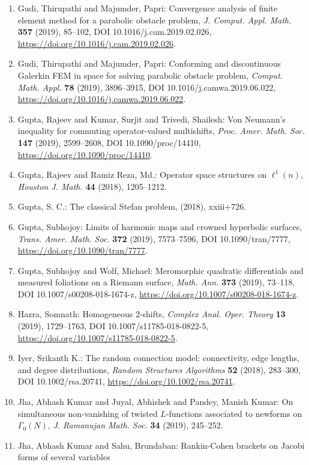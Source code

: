 \begin{enumerate}
\item Gudi, Thirupathi and Majumder, Papri: Convergence analysis of finite element method for a parabolic
obstacle problem, \emph{J. Comput. Appl. Math.} {\bf 357} (2019), 85--102, DOI 10.1016/j.cam.2019.02.026, \url{https://doi.org/10.1016/j.cam.2019.02.026}.
\item Gudi, Thirupathi and Majumder, Papri: Conforming and discontinuous {G}alerkin {FEM} in space for
solving parabolic obstacle problem, \emph{Comput. Math. Appl.} {\bf 78} (2019), 3896--3915, DOI 10.1016/j.camwa.2019.06.022, \url{https://doi.org/10.1016/j.camwa.2019.06.022}.
\item Gupta, Rajeev and Kumar, Surjit and Trivedi, Shailesh: Von {N}eumann's inequality for commuting operator-valued
multishifts, \emph{Proc. Amer. Math. Soc.} {\bf 147} (2019), 2599--2608, DOI 10.1090/proc/14410, \url{https://doi.org/10.1090/proc/14410}.
\item Gupta, Rajeev and Ramiz Reza, Md.: Operator space structures on {$\ell^1(n)$}, \emph{Houston J. Math.} {\bf 44} (2018), 1205--1212.
\item Gupta, S. C.: The classical {S}tefan problem, \emph{} {\bf } (2018), xxiii+726.
\item Gupta, Subhojoy: Limits of harmonic maps and crowned hyperbolic surfaces, \emph{Trans. Amer. Math. Soc.} {\bf 372} (2019), 7573--7596, DOI 10.1090/tran/7777, \url{https://doi.org/10.1090/tran/7777}.
\item Gupta, Subhojoy and Wolf, Michael: Meromorphic quadratic differentials and measured foliations on
a {R}iemann surface, \emph{Math. Ann.} {\bf 373} (2019), 73--118, DOI 10.1007/s00208-018-1674-z, \url{https://doi.org/10.1007/s00208-018-1674-z}.
\item Hazra, Somnath: Homogeneous 2-shifts, \emph{Complex Anal. Oper. Theory} {\bf 13} (2019), 1729--1763, DOI 10.1007/s11785-018-0822-5, \url{https://doi.org/10.1007/s11785-018-0822-5}.
\item Iyer, Srikanth K.: The random connection model: connectivity, edge lengths, and
degree distributions, \emph{Random Structures Algorithms} {\bf 52} (2018), 283--300, DOI 10.1002/rsa.20741, \url{https://doi.org/10.1002/rsa.20741}.
\item Jha, Abhash Kumar and Juyal, Abhishek and Pandey, Manish
Kumar: On simultaneous non-vanishing of twisted {$L$}-functions
associated to newforms on {$\Gamma_0(N)$}, \emph{J. Ramanujan Math. Soc.} {\bf 34} (2019), 245--252.
\item Jha, Abhash Kumar and Sahu, Brundaban: Rankin-{C}ohen brackets on {J}acobi forms of several variables

\end{enumerate}

